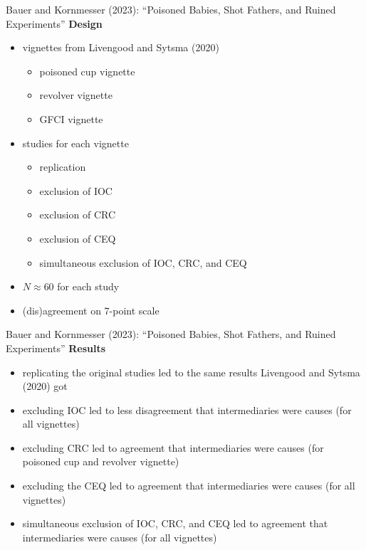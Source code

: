 \documentclass[xcolor=table,9pt,aspectratio=169]{beamer}
\begin{document}
\begin{frame}{\vspace*{10mm}Bauer and Kornmesser (2023): ``Poisoned Babies, Shot Fathers, and Ruined Experiments''}
\vspace*{-5mm}
\textbf{Design}\\
\begin{itemize}
   \item vignettes from Livengood and Sytsma (2020)
      \begin{itemize}
         \item poisoned cup vignette
         \item revolver vignette
         \item GFCI vignette
      \end{itemize}
   \item studies for each vignette
      \begin{itemize}
         \item replication
         \item exclusion of IOC
         \item exclusion of CRC
         \item exclusion of CEQ
         \item simultaneous exclusion of IOC, CRC, and CEQ
      \end{itemize}
   \item $N\approx 60$ for each study
   \item (dis)agreement on 7-point scale
\end{itemize}
\vfill
\end{frame}


\begin{frame}{\vspace*{10mm}Bauer and Kornmesser (2023): ``Poisoned Babies, Shot Fathers, and Ruined Experiments''}
\vspace*{-5mm}
\textbf{Results}\\
\begin{itemize}
   \item replicating the original studies led to the same results Livengood and Sytsma (2020) got
   \item excluding IOC led to less disagreement that intermediaries were causes (for all vignettes)
   \item excluding CRC led to agreement that intermediaries were causes (for poisoned cup and revolver vignette)
   \item excluding the CEQ led to agreement that intermediaries were causes (for all vignettes)
   \item simultaneous exclusion of IOC, CRC, and CEQ led to agreement that intermediaries were causes (for all vignettes)
\end{itemize}
\vfill
\end{frame}
\end{document}
